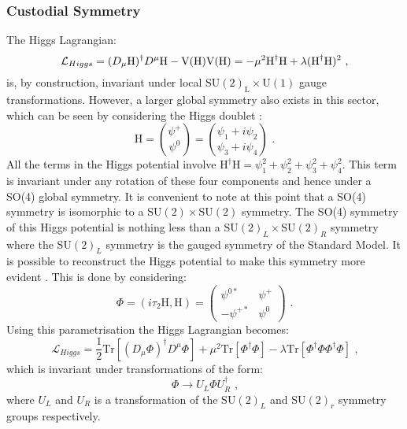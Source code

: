 \subsubsection{Custodial Symmetry}
The Higgs Lagrangian:
%
\begin{equation}
\mathcal{L}_{Higgs} = (D_{\mu}\text{H})^{\dagger}D^{\mu}\text{H} - \text{V}(\text{H}) \\
\text{V}(\text{H}) = -\mu^{2}\text{H}^{\dagger}\text{H} + \lambda (\text{H}^{\dagger}\text{H})^{2} \text{ ,}
\end{equation}
%
\noindent is, by construction, invariant under local $\text{SU}(2)_{\text{L}} \times \text{U}(1)$ gauge transformations.  However, a larger global symmetry also exists in this sector, which can be seen by considering the Higgs doublet \cite{Ellis:1991qj}:
%
\begin{equation}
\text{H} = \binom{\psi^{+}}{\psi^{0}} = \binom{\psi_{1} + i\psi_{2}}{\psi_{3} + i\psi_{4}} \text{ .}
\end{equation}
%
\noindent All the terms in the Higgs potential involve $\text{H}^{\dagger}\text{H} = \psi_{1}^{2} + \psi_{2}^{2} + \psi_{3}^{2} + \psi_{4}^{2}$.  This term is invariant under any rotation of these four components and hence under a SO(4) global symmetry.  It is convenient to note at this point that a SO(4) symmetry is isomorphic to a $\text{SU}(2) \times \text{SU}(2)$ symmetry.  The SO(4) symmetry of this Higgs potential is nothing less than a $\text{SU}(2)_{L} \times \text{SU}(2)_{R}$ symmetry where the $\text{SU}(2)_{L}$ symmetry is the gauged symmetry of the Standard Model.  It is possible to reconstruct the Higgs potential to make this symmetry more evident \cite{Andersen:2011yj, Grojean:2007zz}.  This is done by considering:
%
\begin{equation}
\Phi = (i\tau_{2}\text{H}, \text{H}) = 
\begin{pmatrix}
\psi^{0*} & \psi^{+} \\
-\psi^{+*} & \psi^{0}
\end{pmatrix} 
\text{ .}
\end{equation}
%
\noindent Using this parametrisation the Higgs Lagrangian becomes:
%
\begin{equation}
\mathcal{L}_{Higgs} =  \frac{1}{2}\text{Tr}[(D_{\mu}\Phi)^{\dagger}D^{\mu}\Phi] + \mu^{2}\text{Tr}[\Phi^{\dagger}\Phi] - \lambda \text{Tr}[\Phi^{\dagger}\Phi\Phi^{\dagger}\Phi] \text{ ,}
\end{equation}
%
\noindent which is invariant under transformations of the form:
%
\begin{equation}
\Phi \rightarrow U_{L} \Phi U_{R}^{\dagger} \text{ ,}
\end{equation}
%
\noindent where $U_{L}$ and $U_{R}$ is a transformation of the $\text{SU}(2)_{L}$ and $\text{SU}(2)_{r}$ symmetry groups respectively.

